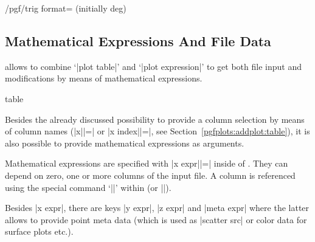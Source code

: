 {\begin{key}{/pgf/trig format= (initially deg)}
\begin{codeexample}[]
\end{codeexample}
\end{key}


\subsection{Mathematical Expressions And File Data}

\PGFPlots{} allows to combine `|plot table|' and `|plot expression|' to get
both file input and modifications by means of mathematical expressions.

\begin{addplotoperation}[]{table}{}
\label{pgfplots:addplot:table:expr}

    Besides the already discussed possibility to provide a column selection by
    means of column names (|x||=| or |x index||=|, see
    Section~\ref{pgfplots:addplot:table}), it is also possible to provide
    mathematical expressions as arguments.

    Mathematical expressions are specified with |x expr||=|
    inside of . They can depend on zero,
    one or more columns of the input file. A column is referenced using the
    special command `|\thisrow|' within  (or
    |\thisrowno|).
\begin{codeexample}[vbox]

\end{codeexample}

    Besides |x expr|, there are keys |y expr|, |z expr| and |meta expr| where
    the latter allows to provide point meta data (which is used as
    |scatter src| or color data for surface plots etc.).


\end{addplotoperation}}

